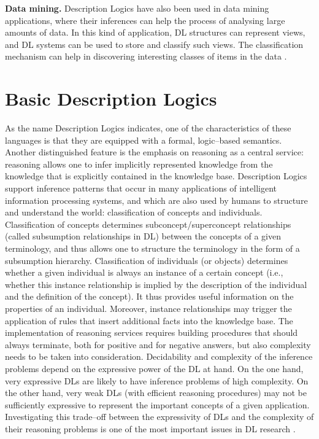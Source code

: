 \documentclass[a4paper, 11pt, oneside]{duthesis}
\begin{document}
\textbf{Data mining.} Description Logics have also been used in data mining applications, where their inferences can help the process of analysing large amounts of data.
In this kind of application, DL structures can represent views, and DL systems can be used to store and classify such views. The classification mechanism can help in discovering interesting classes of items in the data
\cite{Nardi:2003:IDL:885746.885748}.

\newpage

\section{Basic Description Logics}
As the name Description Logics indicates, one of the characteristics of these languages is that they are equipped with a formal, logic--based semantics.
Another distinguished feature is the emphasis on reasoning as a central service: reasoning allows one to infer implicitly represented knowledge from the knowledge that is explicitly contained in the knowledge base.
Description Logics support inference patterns that occur in many applications of intelligent information processing systems, and which are also used by humans to structure and understand the world: classification of concepts and individuals.
Classification of concepts determines subconcept/superconcept relationships (called subsumption relationships in DL) between the concepts of a given terminology, and thus allows one to structure the terminology in the form of a subsumption hierarchy.
Classification of individuals (or objects) determines whether a given individual is always an instance of a certain concept (i.e., whether this instance relationship is implied by the description of the individual and the definition of the concept).
It thus provides useful information on the properties of an individual.
Moreover, instance relationships may trigger the application of rules that insert additional facts into the knowledge base.
The implementation of reasoning services requires building procedures that should always terminate, both for positive and for negative answers, but also complexity needs to be taken into consideration.
Decidability and complexity of the inference problems depend on the expressive power of the DL at hand.
On the one hand, very expressive DLs are likely to have inference problems of high complexity.
On the other hand, very weak DLs (with efficient reasoning procedures) may not be sufficiently expressive to represent the important concepts of a given application.
Investigating this trade--off between the expressivity of DLs and the complexity of their reasoning problems is one of the most important issues in DL research
\cite{Baader:2003:BDL:885746.885749}.
\end{document}
